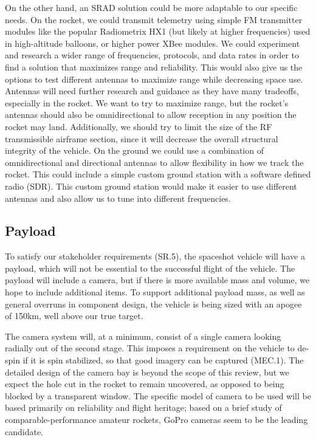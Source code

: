 On the other hand, an SRAD solution could be more adaptable to our specific needs. On the rocket, we could transmit telemetry using simple FM transmitter modules like the popular Radio\-metrix HX1 (but likely at higher frequencies) used in high-altitude balloons, or higher power XBee modules. We could experiment and research a wider range of frequencies, protocols, and data rates in order to find a solution that maximizes range and reliability. This would also give us the options to test different antennas to maximize range while decreasing space use.  Antennas will need further research and guidance as they have many tradeoffs, especially in the rocket. We want to try to maximize range, but the rocket’s antennas should also be omnidirectional to allow reception in any position the rocket may land. Additionally, we should try to limit the size of the RF transmissible airframe section, since it will decrease the overall structural integrity of the vehicle. On the ground we could use a combination of omnidirectional and directional antennas to allow flexibility in how we track the rocket. This could include a simple custom ground station with a software defined radio (SDR). This custom ground station would make it easier to use different antennas and also allow us to tune into different frequencies.


\subsection{Payload}
To satisfy our stakeholder requirements (SR.5), the spaceshot vehicle will have a payload, which will not be essential to the successful flight of the vehicle. The payload will include a camera, but if there is more available mass and volume,  we hope to include additional items. To support additional payload mass, as well as general overruns in component design, the vehicle is being sized with an apogee of 150km, well above our true target.

The camera system will, at a minimum, consist of a single camera looking radially out of the second stage. This imposes a requirement on the vehicle to de-spin if it is spin stabilized, so that good imagery can be captured (MEC.1). The detailed design of the camera bay is beyond the scope of this review, but we expect the hole cut in the rocket to remain uncovered, as opposed to being blocked by a transparent window. The specific model of camera to be used will be based primarily on reliability and flight heritage; based on a brief study of comparable-performance amateur rockets, GoPro cameras seem to be the leading candidate.

